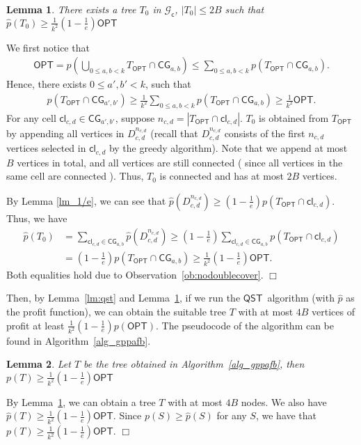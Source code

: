 \documentclass[11pt]{article}
\newcommand{\OPT}{\mathsf{OPT}}
\newcommand{\hp}{\widehat{p}}
\newcommand{\qst}{$\mathsf{QST}$}
\newcommand{\cell}{\mathsf{cl}}
\newcommand{\cells}{\mathsf{CG}}
\newcommand{\Gc}{\mathcal{G}_\mathsf{c}}
\newenvironment{proof}{\noindent {\em Proof: }\ignorespaces}{}
\newcommand{\qed}{\hspace*{\fill}$\Box$\medskip}
\newtheorem{lemma}{Lemma}
\begin{document}
\begin{lemma}
	There exists a tree $T_0$ in $\Gc$,
	$|T_0| \leq 2B$ such that $\displaystyle  \hp(T_0) \geq \frac{1}{k^2}\left(1-\frac{1}{e}\right) \OPT $
	\label{lm_1/k^2}
\end{lemma}
\begin{proof}
	We first notice that
	\begin{align*}
	\OPT = p\left(\displaystyle \bigcup_{0\leq a , b <k} T_{\OPT} \cap \cells_{a,b}\right)
	\leq \displaystyle \sum_{0\leq a ,b <k} p\left(T_{\OPT} \cap \cells_{a,b}\right).
	\end{align*}
	Hence, there exists $0 \leq a',b' < k$, such that
	\begin{align*}
	p(T_{\OPT} \cap \cells_{a',b'}) \geq \frac{1}{k^2} \displaystyle \sum_{0\leq a , b <k} p(T_{\OPT} \cap \cells_{a,b})
	\geq \frac{1}{k^2} \OPT.
	\end{align*}
	For any cell $\cell_{c,d} \in \cells_{a',b'}$, suppose $n_{c,d}=|T_{\OPT}\cap \cell_{c,d}|$.
	$T_0$ is obtained from
	$T_{\OPT}$ by appending all vertices in $D_{c,d}^{n_{c,d}}$ (recall that $D_{c,d}^{n_{c,d}}$ consists of
	the first $n_{c,d}$ vertices selected in $\cell_{c,d}$ by the greedy algorithm).
	Note that we append at most $B$ vertices in total, and all vertices are still connected
	(
	since all vertices in the same cell are connected
	).
	Thus, $T_0$ is connected and has at most $2B$ vertices.
	
	By Lemma \ref{lm_1/e}, we can see that $\hp(D_{c,d}^{n_{c,d}}) \geq \left(1-\frac{1}{e}\right)p(T_{\OPT} \cap \cell_{c,d})$. Thus, we have \begin{align*}
	\hp(T_0)&=\sum_{\cell_{c,d}\in\cells_{a,b}}\hp(D_{c,d}^{n_{c,d}}) \geq \left(1-\frac{1}{e}\right)\sum_{\cell_{c,d}\in\cells_{a,b}}p\left(T_{\OPT} \cap \cell_{c,d}\right)\\
	&=\left(1-\frac{1}{e}\right)p(T_{\OPT} \cap \cells_{a,b}) \geq \frac{1}{k^2}\left(1-\frac{1}{e}\right)\OPT.
	\end{align*}
	Both equalities hold due to Observation~\ref{ob:nodoublecover}.
	\qed
\end{proof}


Then, by Lemma~\ref{lm:qst} and Lemma~\ref{lm_1/k^2},
if we run the \qst\ algorithm (with $\hp$ as the profit function),
we can obtain the suitable tree $T$ with at most $4B$ vertices of profit at least $\frac{1}{k^2}\left(1-\frac{1}{e}\right)p(\OPT)$.
The pseudocode of the algorithm can be found in Algorithm~\ref{alg_gppafb}.


\begin{lemma}
	Let $T$ be the tree obtained in Algorithm~\ref{alg_gppafb}, then
	$p(T) \geq \frac{1}{k^2}\left(1-\frac{1}{e}\right)\OPT$
	\label{lm_treeAppro}
\end{lemma}
\begin{proof}
	By Lemma~\ref{lm_1/k^2}, we can obtain a tree $T$ with at most $4B$ nodes. We also have $\hp(T)\geq \frac{1}{k^2}\left(1-\frac{1}{e}\right)\OPT$.
	Since $p(S)\geq \hp(S)$ for any $S$, we have that
	$
	p(T) \geq \frac{1}{k^2}\left(1-\frac{1}{e}\right)\OPT.
	$
	\qed
\end{proof}
\end{document}
